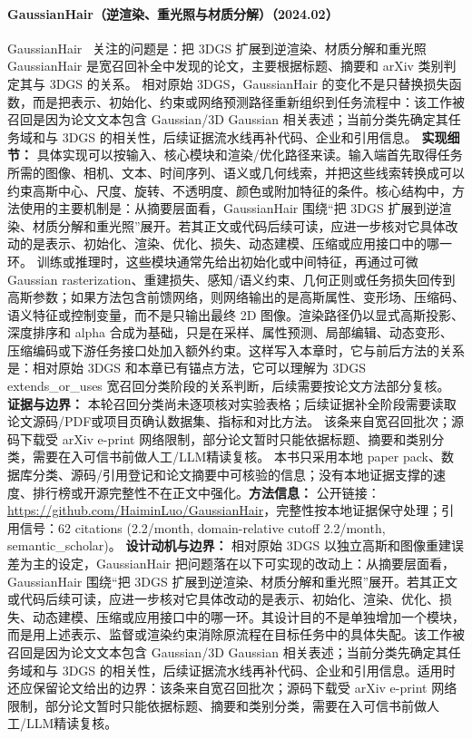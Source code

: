 \paragraph{GaussianHair（逆渲染、重光照与材质分解）（2024.02）}
GaussianHair~\cite{2402_10483} 关注的问题是：把 3DGS 扩展到逆渲染、材质分解和重光照 GaussianHair 是宽召回补全中发现的论文，主要根据标题、摘要和 arXiv 类别判定其与 3DGS 的关系。
相对原始 3DGS，GaussianHair 的变化不是只替换损失函数，而是把表示、初始化、约束或网络预测路径重新组织到任务流程中：该工作被召回是因为论文文本包含 Gaussian/3D Gaussian 相关表述；当前分类先确定其任务域和与 3DGS 的相关性，后续证据流水线再补代码、企业和引用信息。
\textbf{实现细节：} 具体实现可以按输入、核心模块和渲染/优化路径来读。输入端首先取得任务所需的图像、相机、文本、时间序列、语义或几何线索，并把这些线索转换成可以约束高斯中心、尺度、旋转、不透明度、颜色或附加特征的条件。核心结构中，方法使用的主要机制是：从摘要层面看，GaussianHair 围绕“把 3DGS 扩展到逆渲染、材质分解和重光照”展开。若其正文或代码后续可读，应进一步核对它具体改动的是表示、初始化、渲染、优化、损失、动态建模、压缩或应用接口中的哪一环。 训练或推理时，这些模块通常先给出初始化或中间特征，再通过可微 Gaussian rasterization、重建损失、感知/语义约束、几何正则或任务损失回传到高斯参数；如果方法包含前馈网络，则网络输出的是高斯属性、变形场、压缩码、语义特征或控制变量，而不是只输出最终 2D 图像。渲染路径仍以显式高斯投影、深度排序和 alpha 合成为基础，只是在采样、属性预测、局部编辑、动态变形、压缩编码或下游任务接口处加入额外约束。这样写入本章时，它与前后方法的关系是：相对原始 3DGS 和本章已有锚点方法，它可以理解为 3DGS extends\_or\_uses 宽召回分类阶段的关系判断，后续需要按论文方法部分复核。
\textbf{证据与边界：} 本轮召回分类尚未逐项核对实验表格；后续证据补全阶段需要读取论文源码/PDF或项目页确认数据集、指标和对比方法。 该条来自宽召回批次；源码下载受 arXiv e-print 网络限制，部分论文暂时只能依据标题、摘要和类别分类，需要在入可信书前做人工/LLM精读复核。 本书只采用本地 paper pack、数据库分类、源码/引用登记和论文摘要中可核验的信息；没有本地证据支撑的速度、排行榜或开源完整性不在正文中强化。\textbf{方法信息：} 公开链接：\url{https://github.com/HaiminLuo/GaussianHair}，完整性按本地证据保守处理；引用信号：62 citations (2.2/month, domain-relative cutoff 2.2/month, semantic\_scholar)。
\textbf{设计动机与边界：} 相对原始 3DGS 以独立高斯和图像重建误差为主的设定，GaussianHair 把问题落在以下可实现的改动上：从摘要层面看，GaussianHair 围绕“把 3DGS 扩展到逆渲染、材质分解和重光照”展开。若其正文或代码后续可读，应进一步核对它具体改动的是表示、初始化、渲染、优化、损失、动态建模、压缩或应用接口中的哪一环。其设计目的不是单独增加一个模块，而是用上述表示、监督或渲染约束消除原流程在目标任务中的具体失配。该工作被召回是因为论文文本包含 Gaussian/3D Gaussian 相关表述；当前分类先确定其任务域和与 3DGS 的相关性，后续证据流水线再补代码、企业和引用信息。适用时还应保留论文给出的边界：该条来自宽召回批次；源码下载受 arXiv e-print 网络限制，部分论文暂时只能依据标题、摘要和类别分类，需要在入可信书前做人工/LLM精读复核。
